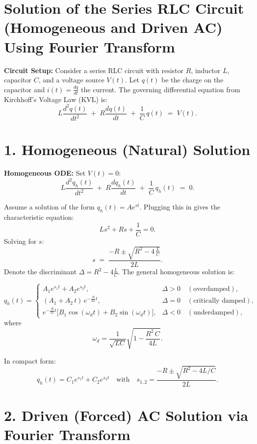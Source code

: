 \documentclass[12pt]{article}
\begin{document}
\section*{Solution of the Series RLC Circuit (Homogeneous and Driven AC) Using Fourier Transform}

\noindent \textbf{Circuit Setup:} 
Consider a series RLC circuit with resistor $R$, inductor $L$, capacitor $C$, and a voltage source $V(t)$. Let $q(t)$ be the charge on the capacitor and $i(t) = \frac{dq}{dt}$ the current. The governing differential equation from Kirchhoff's Voltage Law (KVL) is:
\[
L \frac{d^2 q(t)}{dt^2} \;+\; R \frac{d q(t)}{dt} \;+\; \frac{1}{C} \, q(t) \;=\; V(t).
\]

\vspace{1em}
\section*{1. Homogeneous (Natural) Solution}

\noindent \textbf{Homogeneous ODE:} Set $V(t) = 0$:
\[
L \frac{d^2 q_h(t)}{dt^2} \;+\; R \frac{d q_h(t)}{dt} \;+\; \frac{1}{C} \, q_h(t) \;=\; 0.
\]

\noindent Assume a solution of the form $q_h(t) = A e^{s t}$. Plugging this in gives the characteristic equation:
\[
L s^2 + R s + \frac{1}{C} = 0.
\]
Solving for $s$:
\[
s \;=\; \frac{-R \pm \sqrt{R^2 - 4\,\frac{L}{C}}}{2L}.
\]
Denote the discriminant $\Delta = R^2 - 4\frac{L}{C}$. The general homogeneous solution is:

\[
q_h(t) = 
\begin{cases}
A_1 e^{s_1 t} + A_2 e^{s_2 t}, & \Delta > 0 \quad (\text{overdamped}), \\[1em]
(A_1 + A_2\,t)\,e^{-\frac{R}{2L}t}, & \Delta = 0 \quad (\text{critically damped}), \\[1em]
e^{-\frac{R}{2L}t}\Big[B_1 \cos(\omega_d t) + B_2 \sin(\omega_d t)\Big], & \Delta < 0 \quad (\text{underdamped}),
\end{cases}
\]
where 
\[
\omega_d = \frac{1}{\sqrt{LC}}\sqrt{1 - \frac{R^2\,C}{4L}}.
\]

\noindent In compact form:
\[
q_h(t) = C_1 e^{s_1 t} + C_2 e^{s_2 t} \quad \text{with} \quad s_{1,2} = \frac{-R \pm \sqrt{R^2 - 4L/C}}{2L}.
\]

\vspace{1em}
\section*{2. Driven (Forced) AC Solution via Fourier Transform}
\end{document}
